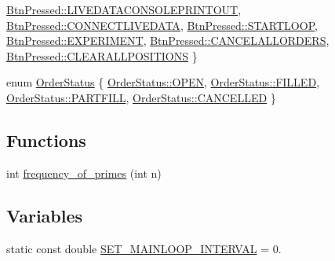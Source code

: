\begin{DoxyCompactItemize}
\hyperlink{namespace_mike_a9dd611fa3c671b02e477e6b21465cc66a8602647ca2d135532c33ebf597ec1199}{Btn\+Pressed\+::\+L\+I\+V\+E\+D\+A\+T\+A\+C\+O\+N\+S\+O\+L\+E\+P\+R\+I\+N\+T\+O\+UT}, 
\hyperlink{namespace_mike_a9dd611fa3c671b02e477e6b21465cc66a66d7f181c31512aa2aa39a7bfac160cc}{Btn\+Pressed\+::\+C\+O\+N\+N\+E\+C\+T\+L\+I\+V\+E\+D\+A\+TA}, 
\newline
\hyperlink{namespace_mike_a9dd611fa3c671b02e477e6b21465cc66afdd7056a8336913761e5b22e5094b13f}{Btn\+Pressed\+::\+S\+T\+A\+R\+T\+L\+O\+OP}, 
\hyperlink{namespace_mike_a9dd611fa3c671b02e477e6b21465cc66a8df329b49b6668b7b1ec13ba71c72864}{Btn\+Pressed\+::\+E\+X\+P\+E\+R\+I\+M\+E\+NT}, 
\hyperlink{namespace_mike_a9dd611fa3c671b02e477e6b21465cc66ad80f2da521c72deea940b13dc9c55138}{Btn\+Pressed\+::\+C\+A\+N\+C\+E\+L\+A\+L\+L\+O\+R\+D\+E\+RS}, 
\hyperlink{namespace_mike_a9dd611fa3c671b02e477e6b21465cc66ab26db120255197418962e537e3e5e301}{Btn\+Pressed\+::\+C\+L\+E\+A\+R\+A\+L\+L\+P\+O\+S\+I\+T\+I\+O\+NS}
 \}
\item 
enum \hyperlink{namespace_mike_a194f722ae64bec13b06019160da629c6}{Order\+Status} \{ \hyperlink{namespace_mike_a194f722ae64bec13b06019160da629c6aa38bd5138bf35514df41a1795ebbf5c3}{Order\+Status\+::\+O\+P\+EN}, 
\hyperlink{namespace_mike_a194f722ae64bec13b06019160da629c6a5b053ae8b6dc09eed2aa8c3a07163a7a}{Order\+Status\+::\+F\+I\+L\+L\+ED}, 
\hyperlink{namespace_mike_a194f722ae64bec13b06019160da629c6a2eed1f37802fbc2235e1a112aebb49d9}{Order\+Status\+::\+P\+A\+R\+T\+F\+I\+LL}, 
\hyperlink{namespace_mike_a194f722ae64bec13b06019160da629c6a9f935beb31030ad0d4d26126c0f39bf2}{Order\+Status\+::\+C\+A\+N\+C\+E\+L\+L\+ED}
 \}
\end{DoxyCompactItemize}
\subsection*{Functions}
\begin{DoxyCompactItemize}
\item 
int \hyperlink{namespace_mike_ada7afe897748f668730c74456952e356}{frequency\+\_\+of\+\_\+primes} (int n)
\end{DoxyCompactItemize}
\subsection*{Variables}
\begin{DoxyCompactItemize}
\item 
static const double \hyperlink{namespace_mike_abbeda217f93388b7dd036c32d183f426}{S\+E\+T\+\_\+\+M\+A\+I\+N\+L\+O\+O\+P\+\_\+\+I\+N\+T\+E\+R\+V\+AL} = 0.
\end{DoxyCompactItemize}


